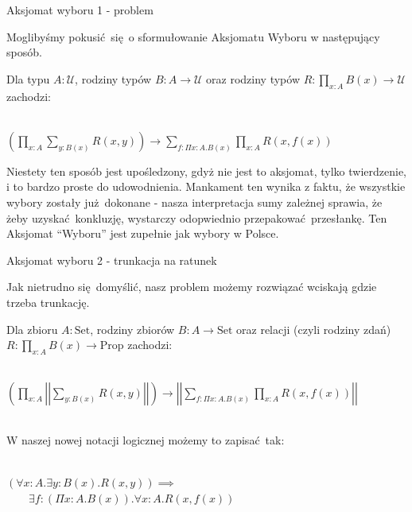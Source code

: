 \documentclass{beamer}
\newcommand{\U}{\mathcal{U}}
\newcommand{\Prop}{\text{Prop}}
\newcommand{\Set}{\text{Set}}
\begin{document}
\begin{frame}{Aksjomat wyboru 1 - problem}

Moglibyśmy pokusić się o sformułowanie Aksjomatu Wyboru w następujący sposób.

\begin{theorem}
Dla typu $A : \U$, rodziny typów $B : A \to \U$ oraz rodziny typów $R : \prod_{x : A} B(x) \to \U$ zachodzi: \\~\

$\displaystyle
	\left(\prod_{x : A} \sum_{y : B(x)} R(x, y)\right) \to
	\sum_{f : \Pi x : A. B(x)} \prod_{x : A} R(x, f(x))
$
\end{theorem}

Niestety ten sposób jest upośledzony, gdyż nie jest to aksjomat, tylko twierdzenie, i to bardzo proste do udowodnienia. Mankament ten wynika z faktu, że wszystkie wybory zostały już dokonane - nasza interpretacja sumy zależnej sprawia, że żeby uzyskać konkluzję, wystarczy odopwiednio przepakować przesłankę. Ten Aksjomat ``Wyboru'' jest zupełnie jak wybory w Polsce.

\end{frame}

\begin{frame}{Aksjomat wyboru 2 - trunkacja na ratunek}

Jak nietrudno się domyślić, nasz problem możemy rozwiązać wciskają gdzie trzeba trunkację.

\begin{definition}
Dla zbioru $A : \Set$, rodziny zbiorów $B : A \to \Set$ oraz relacji (czyli rodziny zdań) $R : \prod_{x : A} B(x) \to \Prop$ zachodzi: \\~\

$\displaystyle
	\left(\prod_{x : A} \left|\left|\sum_{y : B(x)} R(x, y)\right|\right|\right) \to
	\left|\left|\sum_{f : \Pi x : A. B(x)} \prod_{x : A} R(x, f(x))\right|\right|
$ \\~\

W naszej nowej notacji logicznej możemy to zapisać tak: \\~\

$\displaystyle
	(\forall x : A. \exists y : B(x). R(x, y)) \implies
$ \\
$\displaystyle \qquad
	\exists f : (\Pi x : A. B(x)). \forall x : A. R(x, f(x))
$
\end{definition}

\end{frame}
\end{document}
